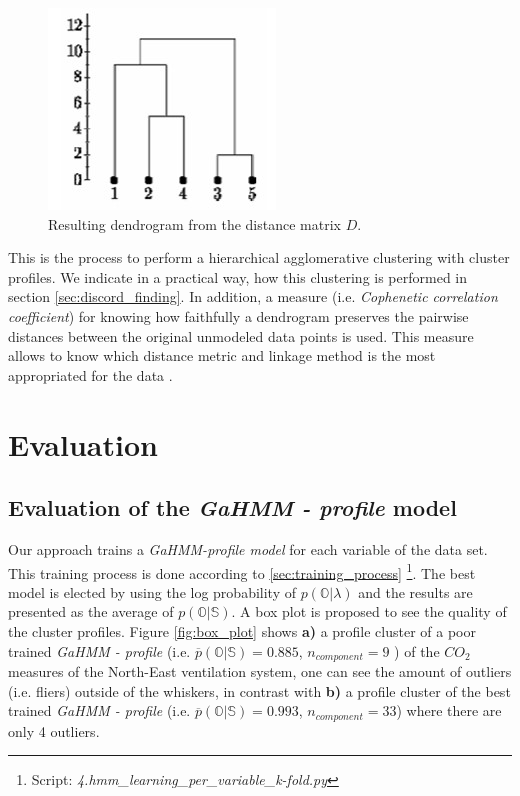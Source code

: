\begin{figure}[h!]
  \vspace{0.5em} %
  \includegraphics[scale=0.65]{Figures/dendogram_result.jpg}
  \caption{Resulting dendrogram from the distance matrix $D$.}
  \label{fig:dendogram_total}
\end{figure}


This is the process to perform a hierarchical agglomerative clustering with cluster profiles. We indicate in a practical way, how this clustering is performed in section \ref{sec:discord_finding}. In addition, a measure (i.e. \textit{Cophenetic correlation coefficient}) for knowing how faithfully a dendrogram preserves the pairwise distances between the original unmodeled data points is used. This measure allows to know which distance metric and linkage method is the most appropriated for the data \cite{saraccli2013comparison}. 

\section{Evaluation}
\label{sec:eval_all}

\subsection{Evaluation of the \textit{GaHMM - profile} model}
\label{sec:profile_evaluation}

Our approach trains a \textit{GaHMM-profile model} for each variable of the data set. This training process is done according to \ref{sec:training_process} \footnote{Script: \textit{4.hmm\_learning\_per\_variable\_k-fold.py}}. The best model is elected by using the log probability of $ p(\mathbb{O}|\lambda)$ and the results are presented as the average of $p(\mathbb{O}|\mathbb{S})$. A box plot is proposed to see the quality of the cluster profiles. Figure \ref{fig:box_plot} shows \textbf{a)} a profile cluster of a poor trained \textit{GaHMM - profile} (i.e. $\overline{p}(\mathbb{O}|\mathbb{S}) = 0.885 $, $n_{component}=9$ ) of the $CO_2$ measures of the North-East ventilation system,  one can see the amount of outliers (i.e. fliers) outside of the whiskers, in contrast with \textbf{b)} a profile cluster of the best trained \textit{GaHMM - profile} (i.e. $\overline{p}(\mathbb{O}|\mathbb{S}) = 0.993 $, $n_{component}=33$) where there are only 4 outliers.   

